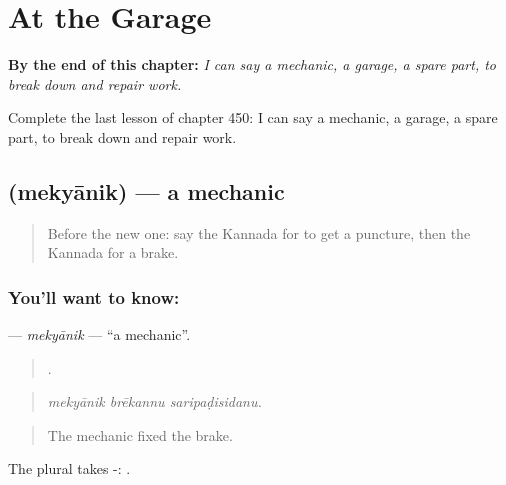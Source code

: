 
\chapter{At the Garage}
\label{ch:ka-at-the-garage}

\begin{chapteropening}
\textbf{By the end of this chapter:} \emph{I can say a mechanic, a garage, a spare part, to break down and repair work.}

Complete the last lesson of chapter 450: I can say a mechanic, a garage, a spare part, to break down and repair work.
\end{chapteropening}

\section[\texorpdfstring{\kn{ಮೆಕ್ಯಾನಿಕ್} (mekyānik)}{ಮೆಕ್ಯಾನಿಕ್ (mekyānik)}]{ (mekyānik) — a mechanic}

\label{lesson:KA-C450-mekyanik}



\begin{quote}
Before the new one: say the Kannada for to get a puncture, then the Kannada for a brake.
\end{quote}

\subsection*{You'll want to know: }
\textbf{} — \emph{mekyānik} — \textquotedblleft{}a mechanic\textquotedblright{}.

\begin{quote}
  .
\end{quote}

\begin{quote}
\emph{mekyānik brēkannu saripaḍisidanu.}
\end{quote}

\begin{quote}
The mechanic fixed the brake.
\end{quote}

The plural takes -: .

